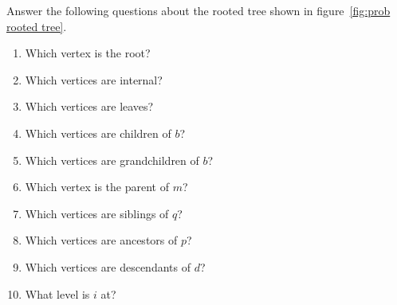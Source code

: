 \begin{prob}\label{prob: rooted tree}
 Answer the following questions about the rooted tree shown in figure~\ref{fig:prob rooted tree}. 
 
 \vspace*{0.25cm}
 \begin{minipage}{0.55\textwidth}
  \begin{enumerate}[label=(\alph*)]
    \item Which vertex is the root?
    \item Which vertices are internal?
    \item Which vertices are leaves?
    \item Which vertices are children of $b$?
    \item Which vertices are grandchildren of $b$?
  \end{enumerate}
  \end{minipage}
  \quad
 \begin{minipage}{0.55\textwidth}
  \begin{enumerate}[label=(\alph*)]\setcounter{enumi}{5}
    \item Which vertex is the parent of $m$?
    \item Which vertices are siblings of $q$?
    \item Which vertices are ancestors of $p$? 
    \item  Which vertices are descendants of $d$?
    \item  What level is $i$ at?
  \end{enumerate}  
 \end{minipage}


\end{prob}
